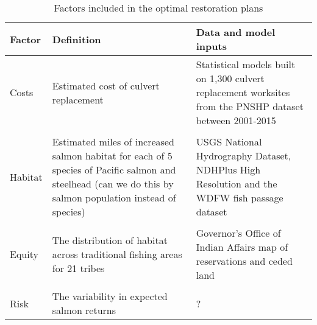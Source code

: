 \documentclass[12pt]{elsarticle}
\begin{document}
\begin{table}[htbp]
  \centering
  \caption{Factors included in the optimal restoration plans}
    \begin{tabular}{llp{18.835em}}\hline
    \textbf{Factor} & \textbf{Definition} & \multicolumn{1}{l}{\textbf{Data and model inputs}} \\\hline
    Costs & Estimated cost of culvert replacement & Statistical models built on 1,300 culvert replacement worksites from the PNSHP dataset between 2001-2015 \\
& &\\
    Habitat & \multicolumn{1}{p{17.335em}}{Estimated miles of increased salmon habitat for each of 5 species of Pacific salmon and steelhead (can we do this by salmon population instead of species)} & USGS National Hydrography Dataset, NDHPlus High Resolution and the WDFW fish passage dataset \\
& &\\
    Equity & \multicolumn{1}{p{17.335em}}{The distribution of habitat across traditional fishing areas for 21 tribes} & Governor's Office of Indian Affairs map of reservations and ceded land \\
& &\\
    Risk  & The variability in expected salmon returns & ? \\\hline
    \end{tabular}%
  \label{tab:factors}%
\end{table}%
\end{document}
